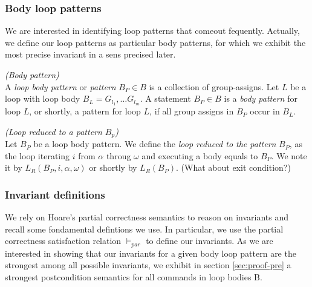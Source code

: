\documentclass[a4paper,10pt]{article}
\newcommand{\idx}{\ensuremath{i}\xspace}
\newcommand{\idxinitial}{\ensuremath{\alpha}\xspace}
\newcommand{\idxfinal}{\ensuremath{\omega}\xspace}
\newcommand{\SB}{\ensuremath{\mathit{B}}}
\newenvironment{definition}[1][Definition]{\begin{trivlist}
\item[\hskip \labelsep {\bfseries #1}]}{\end{trivlist}}
\begin{document}
\subsubsection*{Body loop patterns}

We are interested in identifying  loop patterns that comeout  fequently. 
Actually, we define our loop patterns as particular body patterns, 
for which we exhibit the most precise invariant in a sens precised later.

\begin{definition} \emph{(Body pattern)}\\
A \textit{loop body pattern} or \textit{pattern} $B_P \in \SB$ is a collection of group-assigns.
Let $L$ be a loop with loop body $B_L = G_{l_1}, \ldots G_{l_m}$. 
A statement $B_P \in \SB$ is a \textit{body pattern} for loop $L$, or shortly, 
a pattern for loop $L$, if all group assigns in $B_P$ occur in $B_L$.
\end{definition}

\begin{definition} \emph{(Loop reduced to a pattern $B_p$)}\\
Let $B_P$ be a loop body pattern. We define the \textit{loop reduced to the pattern} $B_P$, 
as the loop  iterating \idx from $\idxinitial$ throug $\idxfinal$ and executing a body equals to $B_P$.
We note it by $L_R(B_P, i, \idxinitial,\idxfinal)$ or shortly by $L_R(B_P)$. (What about exit condition?)
\end{definition}
\subsubsection*{Invariant definitions}

We rely on Hoare's partial correctness semantics to reason on invariants and recall
some fondamental defintions we use. In particular, we use the partial correctness 
satisfaction relation $\vDash_{par}$ to define our invariants.
As we are interested in showing that our invariants for a given body loop pattern are 
the strongest among all possible invariants, we exhibit in section \ref{sec:proof-pre} 
a strongest postcondition semantics for all commands in loop bodies {B}.
\end{document}
